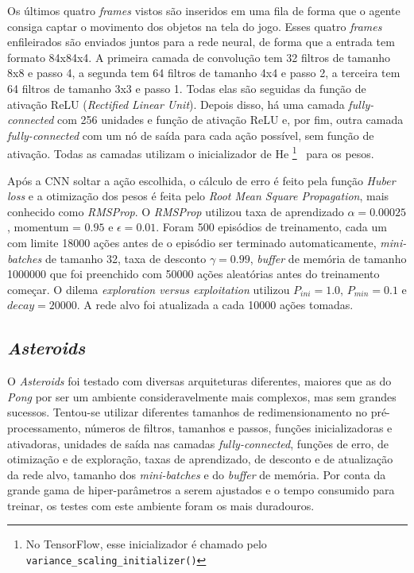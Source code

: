 Os últimos quatro \textit{frames} vistos são inseridos em uma fila de forma que o agente consiga captar o movimento dos objetos na tela do jogo.
Esses quatro \textit{frames} enfileirados são enviados juntos para a rede neural, de forma que a entrada tem formato 84x84x4.
A primeira camada de convolução tem 32 filtros de tamanho 8x8 e passo 4, a segunda tem 64 filtros de tamanho 4x4 e passo 2, a terceira tem 64 filtros de tamanho 3x3 e passo 1.
Todas elas são seguidas da função de ativação ReLU (\textit{Rectified Linear Unit}).
Depois disso, há uma camada \textit{fully-connected} com 256 unidades e função de ativação ReLU e, por fim, outra camada \textit{fully-connected} com um nó de saída para cada ação possível, sem função de ativação.
Todas as camadas utilizam o inicializador de He \footnote{No TensorFlow, esse inicializador é chamado pelo \texttt{variance\_scaling\_initializer()}}~\cite{DBLP:journals/corr/HeZR015} para os pesos.

Após a CNN soltar a ação escolhida, o cálculo de erro é feito pela função \textit{Huber loss} e a otimização dos pesos é feita pelo \textit{Root Mean Square Propagation}, mais conhecido como \textit{RMSProp}.
O \textit{RMSProp} utilizou taxa de aprendizado $\alpha = 0.00025$, momentum = $0.95$ e $\epsilon = 0.01$.
Foram 500 episódios de treinamento, cada um com limite 18000 ações antes de o episódio ser terminado automaticamente, \textit{mini-batches} de tamanho 32, taxa de desconto $\gamma = 0.99$, \textit{buffer} de memória de tamanho 1000000 que foi preenchido com 50000 ações aleatórias antes do treinamento começar.
O dilema \textit{exploration versus exploitation} utilizou $P_{ini} = 1.0$, $P_{min} = 0.1$ e $decay = 20000$.
A rede alvo foi atualizada a cada 10000 ações tomadas.

\subsection{\textit{Asteroids}}
\label{sec:arq_asteroids}

O \textit{Asteroids} foi testado com diversas arquiteturas diferentes, maiores que as do \textit{Pong} por ser um ambiente consideravelmente mais complexos, mas sem grandes sucessos.
Tentou-se utilizar diferentes tamanhos de redimensionamento no pré-processamento, números de filtros, tamanhos e passos, funções inicializadoras e ativadoras, unidades de saída nas camadas \textit{fully-connected}, funções de erro, de otimização e de exploração, taxas de aprendizado, de desconto e de atualização da rede alvo, tamanho dos \textit{mini-batches} e do \textit{buffer} de memória.
Por conta da grande gama de hiper-parâmetros a serem ajustados e o tempo consumido para treinar, os testes com este ambiente foram os mais duradouros.


